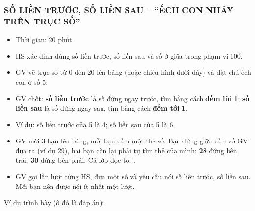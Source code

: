 \documentclass[../main.tex]{subfiles}
\begin{document}
\subsubsection{SỐ LIỀN TRƯỚC, SỐ LIỀN SAU -- “ẾCH CON NHẢY TRÊN TRỤC SỐ”}
\begin{hd}
    \begin{itemize}
        \item Thời gian: 20 phút
        \item HS xác định đúng số liền trước, số liền sau và số ở giữa trong phạm vi 100.
    \end{itemize}
\end{hd}
\begin{itemize}
    \item GV vẽ trục số từ 0 đến 20 lên bảng (hoặc chiếu hình dưới đây) và đặt chú ếch con ở số 5: 
\end{itemize}
\begin{center}
    \GAtrucso
\end{center}
\begin{itemize}
    \item GV chốt: \textbf{số liền trước} là số đứng ngay trước, tìm bằng cách \textbf{đếm lùi 1}; \textbf{số liền sau} là số đứng ngay sau, tìm bằng cách \textbf{đếm tới 1}.
    \item Ví dụ: số liền trước của 5 là 4; số liền sau của 5 là 6.
\end{itemize}
\begin{itemize}
    \item GV mời 3 bạn lên bảng, mỗi bạn cầm một thẻ số. Bạn đứng giữa cầm số GV đưa ra (ví dụ 29), hai bạn còn lại phải tự tìm thẻ của mình: \textbf{28} đứng bên trái, \textbf{30} đứng bên phải. Cả lớp đọc to: .
    \item GV gọi lần lượt từng HS, đưa một số và yêu cầu nói số liền trước, số liền sau. Mỗi bạn nên được nói ít nhất một lượt.
\end{itemize}
\begin{vd}
    Ví dụ trình bày (ô đỏ là đáp án):
    \par\nopagebreak{}
\end{vd}
\end{document}
